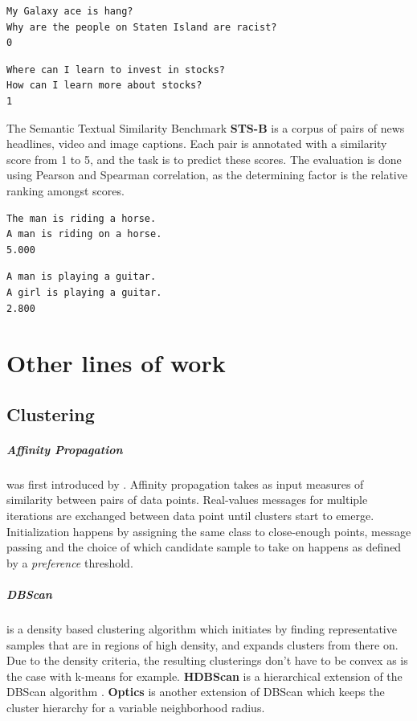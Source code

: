 \documentclass[a4paper,12pt,oneside,openright]{report}
\begin{document}
\begin{verbatim}
My Galaxy ace is hang?	
Why are the people on Staten Island are racist?	
0
\end{verbatim}

\begin{verbatim}
Where can I learn to invest in stocks?	
How can I learn more about stocks?	
1
\end{verbatim}

The Semantic Textual Similarity Benchmark \textbf{STS-B} \cite{cer2017} is a corpus of pairs of news headlines, video and image captions.
Each pair is annotated with a similarity score from 1 to 5, and the task is to predict these scores.
The evaluation is done using Pearson and Spearman correlation, as the determining factor is the relative ranking amongst scores.


\begin{verbatim}
The man is riding a horse.	
A man is riding on a horse.	
5.000
\end{verbatim}

\begin{verbatim}
A man is playing a guitar.
A girl is playing a guitar.	
2.800
\end{verbatim}


\chapter{Other lines of work}

\section{Clustering}\label{appendix:Clustering}

\paragraph{Affinity Propagation} was first introduced by \cite{frey07}.
Affinity propagation takes as input measures of similarity between pairs of data points. 
Real-values messages for multiple iterations are exchanged between data point until clusters start to emerge.
Initialization happens by assigning the same class to close-enough points, message passing and the choice of which candidate sample to take on happens as defined by a \textit{preference} threshold.

\paragraph{DBScan} is a density based clustering algorithm \cite{ester96} which initiates by finding representative samples that are in regions of high density, and expands clusters from there on.
Due to the density criteria, the resulting clusterings don't have to be convex as is the case with k-means for example. \textbf{HDBScan} is a hierarchical extension of the DBScan algorithm \cite{campello13}. \textbf{Optics} \cite{mihael99} is another extension of DBScan which keeps the cluster hierarchy for a variable neighborhood radius.
\end{document}
